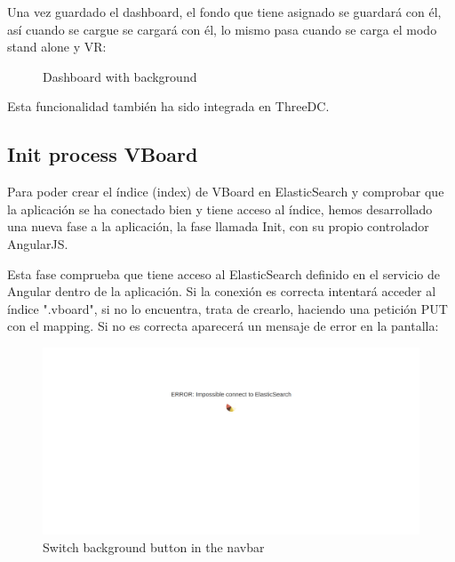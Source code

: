 \documentclass[a4paper, 12pt]{book}
\begin{document}
Una vez guardado el dashboard, el fondo que tiene asignado se guardará con él, así cuando se cargue se cargará con él, lo mismo pasa cuando se carga el modo stand alone y VR:

\begin{figure}[H]
 \centering
 \caption{Dashboard with background}
 \label{f:threedcexamples}
\end{figure}


Esta funcionalidad también ha sido integrada en ThreeDC.



\subsection{Init process VBoard}

Para poder crear el índice (index) de VBoard en ElasticSearch y comprobar que la aplicación se ha conectado bien y tiene acceso al índice, hemos desarrollado una nueva fase a la aplicación, la fase llamada Init, con su propio controlador AngularJS.

Esta fase comprueba que tiene acceso al ElasticSearch definido en el servicio de Angular dentro de la aplicación. Si la conexión es correcta intentará acceder al índice ".vboard", si no lo encuentra, trata de crearlo, haciendo una petición PUT con el mapping. Si no es correcta aparecerá un mensaje de error en la pantalla:

\begin{figure}[H]
  \centering
  \includegraphics[width=16cm, keepaspectratio]{img/development/errorconnectes}
  \caption{Switch background button in the navbar}
  \label{fig:examplestandalone}
\end{figure}
\end{document}
